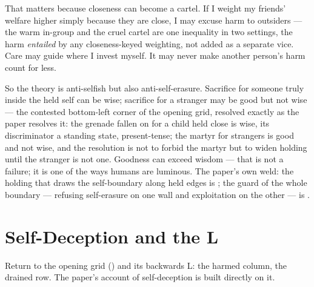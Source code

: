 \documentclass[../main_explainer]{subfiles}
\begin{document}
That matters because closeness can become a cartel. If I weight my friends' welfare
higher simply because they are close, I may excuse harm to outsiders --- the warm
in-group and the cruel cartel are one inequality in two settings, the harm
\emph{entailed} by any closeness-keyed weighting, not added as a separate vice. Care may
guide where I invest myself. It may never make another person's harm count for less.

So the theory is anti-selfish but also anti-self-erasure. Sacrifice for someone truly
inside the held self can be wise; sacrifice for a stranger may be good but not wise ---
the contested bottom-left corner of the opening grid, resolved exactly as the paper
resolves it: the grenade fallen on for a child held close is wise, its discriminator a
standing state, present-tense; the martyr for strangers is good and not wise, and the
resolution is not to forbid the martyr but to widen holding until the stranger is not
one. Goodness can exceed wisdom --- that is not a failure; it is one of the ways humans
are luminous. The paper's own weld: the holding that draws the self-boundary along held
edges is ; the guard of the whole boundary --- refusing self-erasure
on one wall and exploitation on the other --- is .



\section{Self-Deception and the L}
\label{sec:explainer:the-L}

Return to the opening grid () and its backwards L: the harmed column, the
drained row. The paper's account of self-deception is built directly on it.
\end{document}
